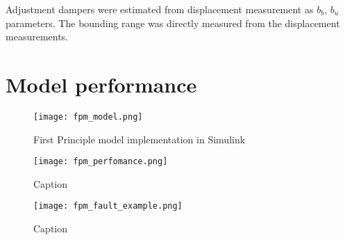 Adjustment dampers were estimated from displacement measurement as $b_b$,
$b_u$ parameters. The bounding range was directly measured from the
displacement measurements.

\section{Model performance}

\begin{figure}[ptbh!]
    \centering
    \texttt{[image: fpm\_model.png]}
    \caption{First Principle model implementation in Simulink}
    \label{fig:fpm_simulink}
\end{figure}


\begin{figure}[h!]
    \centering
    \texttt{[image: fpm\_perfomance.png]}
    \caption{Caption}
    \label{fig:}
\end{figure}


\newpage

\begin{figure}[h!]
    \centering
    \texttt{[image: fpm\_fault\_example.png]}
    \caption{Caption}
    \label{fig:}
\end{figure}







